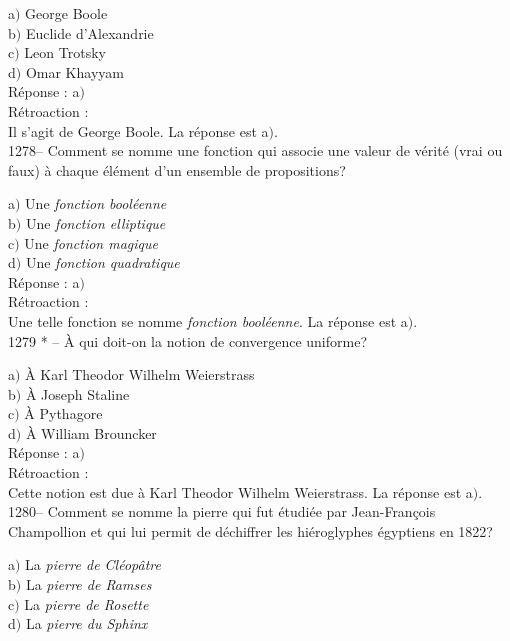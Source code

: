 ﻿\documentclass[letterpaper, 12pt]{article}
\begin{document}
a$)$ George Boole \\
b$)$ Euclide d'Alexandrie \\
c$)$ Leon Trotsky \\
d$)$ Omar Khayyam\\

R\'eponse : a$)$\\

R\'etroaction : \\
Il s'agit de George Boole.
La r\'eponse est  a$)$.\\

1278-- Comment se nomme une fonction qui associe une valeur de v\'erit\'e
(vrai ou faux) \`a chaque
\'el\'ement d'un ensemble de propositions?

a$)$ Une {\sl fonction bool\'eenne} \\
b$)$ Une {\sl fonction elliptique} \\
c$)$ Une {\sl fonction magique} \\
d$)$ Une {\sl fonction quadratique}\\

R\'eponse : a$)$\\

R\'etroaction : \\
Une telle fonction se nomme {\sl fonction bool\'eenne}.
La r\'eponse est  a$)$.\\

1279 * -- \`A qui doit-on la notion de convergence uniforme?

a$)$ \`A Karl Theodor Wilhelm Weierstrass \\
b$)$ \`A Joseph Staline \\
c$)$ \`A Pythagore \\
d$)$ \`A William Brouncker\\

R\'eponse : a$)$\\

R\'etroaction : \\
Cette notion est due \`a Karl Theodor Wilhelm Weierstrass.
La r\'eponse est  a$)$.\\

1280-- Comment se nomme la pierre qui fut \'etudi\'ee par
Jean-Fran\c cois Champollion et qui lui permit de d\'echiffrer les
hi\'eroglyphes \'egyptiens en 1822?

a$)$ La {\sl pierre de Cl\'eop\^atre} \\
b$)$ La {\sl pierre de Ramses} \\
c$)$ La {\sl pierre de Rosette} \\
d$)$ La {\sl pierre du Sphinx}\\
\end{document}
